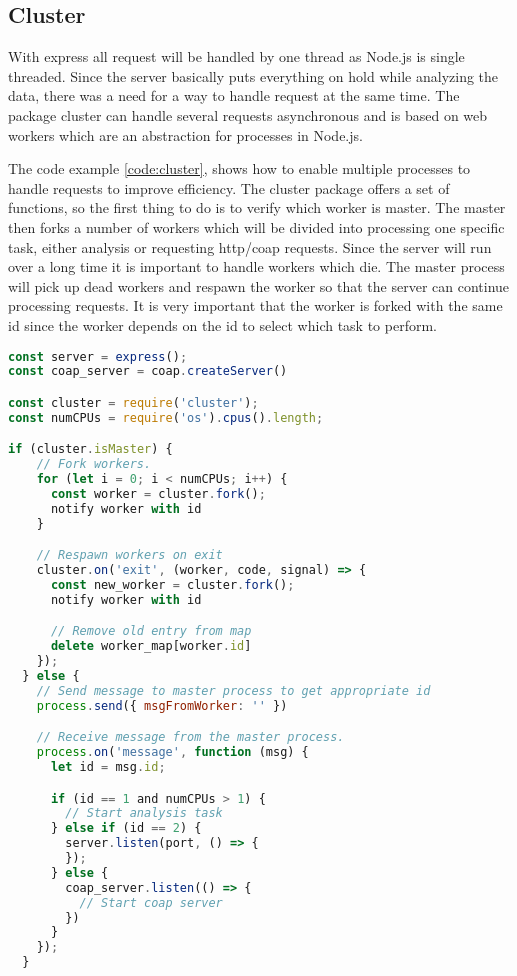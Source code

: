\documentclass[USenglish]{ifimaster}  %
\begin{document}
\subsection{Cluster}
With express all request will be handled by one thread as Node.js is single threaded. Since the server basically puts everything on hold while analyzing the data, there was a need for a way to handle request at the same time. The package cluster can handle several requests asynchronous and is based on web workers which are an abstraction for processes in Node.js\cite{npm:cluster}.

The code example \vref{code:cluster}, shows how to enable multiple processes to handle requests to improve efficiency. The cluster package offers a set of functions, so the first thing to do is to verify which worker is master. The master then forks a number of workers which will be divided into processing one specific task, either analysis or requesting \acrshort{http}/\acrshort{coap} requests. Since the server will run over a long time it is important to handle workers which die. The master process will pick up dead workers and respawn the worker so that the server can continue processing requests. It is very important that the worker is forked with the same id since the worker depends on the id to select which task to perform.

\begin{lstlisting}[caption={Express setup with cluster},label={code:cluster},language=JavaScript]
const server = express();
const coap_server = coap.createServer()

const cluster = require('cluster');
const numCPUs = require('os').cpus().length;

if (cluster.isMaster) {
    // Fork workers.
    for (let i = 0; i < numCPUs; i++) {
      const worker = cluster.fork();
      notify worker with id
    }

    // Respawn workers on exit
    cluster.on('exit', (worker, code, signal) => {
      const new_worker = cluster.fork();
      notify worker with id

      // Remove old entry from map
      delete worker_map[worker.id]
    });
  } else {
    // Send message to master process to get appropriate id
    process.send({ msgFromWorker: '' })

    // Receive message from the master process.
    process.on('message', function (msg) {
      let id = msg.id;

      if (id == 1 and numCPUs > 1) {
        // Start analysis task
      } else if (id == 2) {
        server.listen(port, () => {
        });
      } else {
        coap_server.listen(() => {
          // Start coap server
        })
      }
    });
  }
\end{lstlisting}
\end{document}
